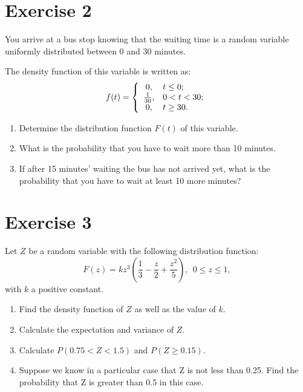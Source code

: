 \documentclass[12pt,thmsa]{article}
\begin{document}
\section*{Exercise 2}

You arrive at a bus stop knowing that the waiting time is a random variable uniformly distributed between 0 and 30 minutes.

\medskip

\noindent The density function of this variable is written as:
 $$
 f (t) = \left\{ \begin{array}{cl}
 0 , & t \le 0;\\
 {1\over 30} , & 0 < t < 30;\\
 0 , & t \ge 30.
 \end{array} \right.
 $$
\smallskip

 \begin{enumerate}%
 \item Determine the distribution function $F(t)$ of this variable.
 \item What is the probability that you have to wait more than 10 minutes.
 \item If after 15 minutes' waiting the bus has not arrived yet, what is the probability that you have to wait at least 10 more minutes?
 \end{enumerate}



\section*{Exercise 3}


Let $Z$ be a random variable with the following distribution function:
$$
F(z)=k z^{3} \left (\frac{1}{3} - \frac{z}{2} + \frac{z^{2}}{5} \right ), \ \ 0 \leq z \leq 1,
$$
with $k$ a positive constant.
\medskip

\begin{enumerate}%
\item {Find the density function of $Z$ as well as the value of $k$.}
\item {Calculate the expectation and variance of $Z$.}
\item {Calculate $P(0.75 < Z < 1.5)$ and $P(Z \geq 0.15)$.}
\item Suppose we know in a particular case that Z is not less than 0.25. Find the probability that Z is greater than 0.5 in this case.

\end{enumerate}
\end{document}
